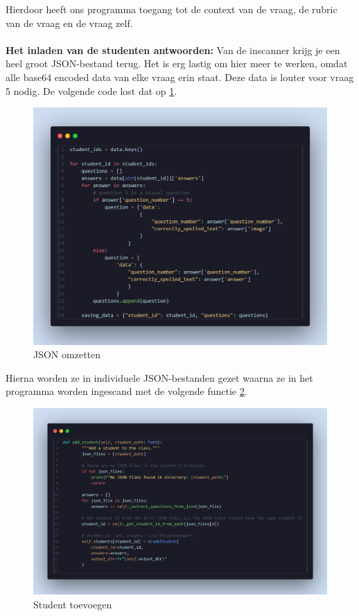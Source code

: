 \documentclass[12pt]{article}
\begin{document}
Hierdoor heeft ons programma toegang tot de context van de vraag, de rubric van de vraag en de vraag zelf. 
\\\\
\textbf{Het inladen van de studenten antwoorden:}
Van de inscanner krijg je een heel groot JSON-bestand terug. Het is erg lastig om hier meer te werken, omdat alle base64 encoded data van elke vraag erin staat. Deze data is louter voor vraag 5 nodig. De volgende code lost dat op \ref{fig:json_transformn}.

\begin{figure}[H] %
    \centering
    \includegraphics[width=0.8 \textwidth]{./images/methoden/nakijken/change_json.png}
    \caption{JSON omzetten}
    \label{fig:json_transformn}
\end{figure}
Hierna worden ze in individuele JSON-bestanden gezet waarna ze in het programma worden ingescand met de volgende functie \ref{fig:add_student}.
\begin{figure}[H] %
    \centering
    \includegraphics[width=0.9 \textwidth]{./images/methoden/nakijken/add_student.png}
    \caption{Student toevoegen}
    \label{fig:add_student}
\end{figure}
\end{document}
